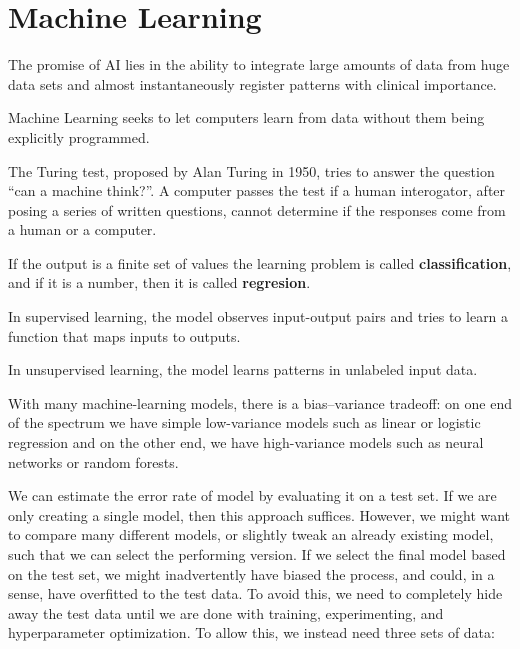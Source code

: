 \chapter{Machine Learning}

The promise of AI lies in the ability 
to integrate large amounts of data from huge data sets
and almost instantaneously register patterns
with clinical importance.

Machine Learning seeks to let computers learn from data
without them being explicitly programmed.


The Turing test, proposed by Alan Turing in 1950,
tries to answer the question \enquote{can a machine think?}.
A computer passes the test if a human interogator,
after posing a series of written questions,
cannot determine if the responses come from a human or a computer.



If the output is a finite set of values
the learning problem is called \textbf{classification},
and if it is a number, then it is called \textbf{regresion}.

In supervised learning, the model observes input-output pairs
and tries to learn a function that maps inputs to outputs.

In unsupervised learning, the model learns patterns in unlabeled input data.

With many machine-learning models, there is a bias--variance tradeoff:
on one end of the spectrum we have simple low-variance models 
such as linear or logistic regression
and on the other end, we have high-variance models
such as neural networks or random forests.

We can estimate the error rate of model
by evaluating it on a test set.
If we are only creating a single model,
then this approach suffices. 
However, we might want to compare many different models,
or slightly tweak an already existing model,
such that we can select the performing version.
If we select the final model based on the test set,
we might inadvertently have biased the process,
and could, in a sense, have overfitted to the test data.
To avoid this, we need to completely hide away the test data
until we are done with training, experimenting, 
and hyperparameter optimization.
To allow this, we instead need three sets of data:

